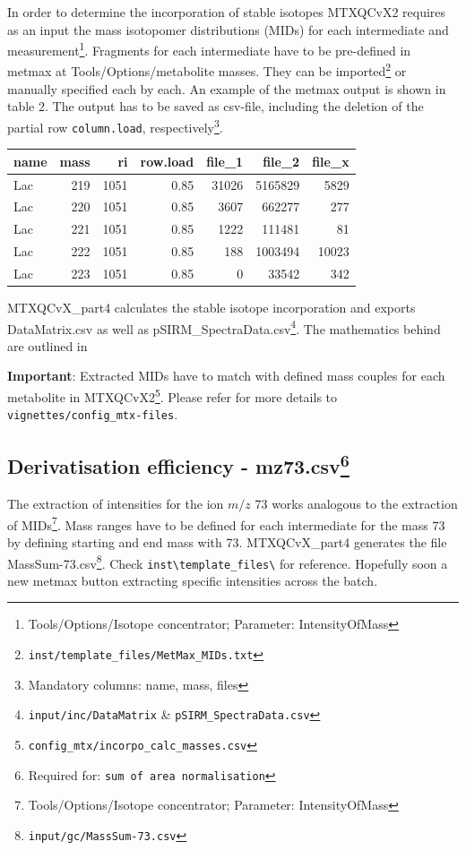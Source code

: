 \documentclass[]{book}
\let\rmarkdownfootnote\footnote%
\def\footnote{\protect\rmarkdownfootnote}
\theoremstyle{definition}
\theoremstyle{definition}
\theoremstyle{definition}
\theoremstyle{remark}
\begin{document}
In order to determine the incorporation of stable isotopes MTXQCvX2
requires as an input the mass isotopomer distributions (MIDs) for each
intermediate and measurement\footnote{Tools/Options/Isotope
  concentrator; Parameter: IntensityOfMass}. Fragments for each
intermediate have to be pre-defined in metmax at
Tools/Options/metabolite masses. They can be imported\footnote{\texttt{inst/template\_files/MetMax\_MIDs.txt}}
or manually specified each by each. An example of the metmax output is
shown in table 2. The output has to be saved as csv-file, including the
deletion of the partial row \texttt{column.load}, respectively\footnote{Mandatory
  columns: name, mass, files}.

\begin{tabular}{l|r|r|r|r|r|r}
\hline
name & mass & ri & row.load & file\_1 & file\_2 & file\_x\\
\hline
Lac & 219 & 1051 & 0.85 & 31026 & 5165829 & 5829\\
\hline
Lac & 220 & 1051 & 0.85 & 3607 & 662277 & 277\\
\hline
Lac & 221 & 1051 & 0.85 & 1222 & 111481 & 81\\
\hline
Lac & 222 & 1051 & 0.85 & 188 & 1003494 & 10023\\
\hline
Lac & 223 & 1051 & 0.85 & 0 & 33542 & 342\\
\hline
\end{tabular}

MTXQCvX\_part4 calculates the stable isotope incorporation and exports
DataMatrix.csv as well as pSIRM\_SpectraData.csv\footnote{\texttt{input/inc/DataMatrix}
  \& \texttt{pSIRM\_SpectraData.csv}}. The mathematics behind are
outlined in \citep{Pietzke2014}

\textbf{Important}: Extracted MIDs have to match with defined mass
couples for each metabolite in MTXQCvX2\footnote{\texttt{config\_mtx/incorpo\_calc\_masses.csv}}.
Please refer for more details to \texttt{vignettes/config\_mtx-files}.

\subsection[Derivatisation efficiency -
mz73.csv]{\texorpdfstring{Derivatisation efficiency - mz73.csv\footnote{Required
  for: \texttt{sum\ of\ area\ normalisation}}}{Derivatisation efficiency - mz73.csv}}\label{derivatisation-efficiency---mz73.csv}

The extraction of intensities for the ion \(m/z\) 73 works analogous to
the extraction of MIDs\footnote{Tools/Options/Isotope concentrator;
  Parameter: IntensityOfMass}. Mass ranges have to be defined for each
intermediate for the mass 73 by defining starting and end mass with 73.
MTXQCvX\_part4 generates the file MassSum-73.csv\footnote{\texttt{input/gc/MassSum-73.csv}}.
Check \texttt{inst\textbackslash{}template\_files\textbackslash{}} for
reference. Hopefully soon a new metmax button extracting specific
intensities across the batch.
\end{document}
